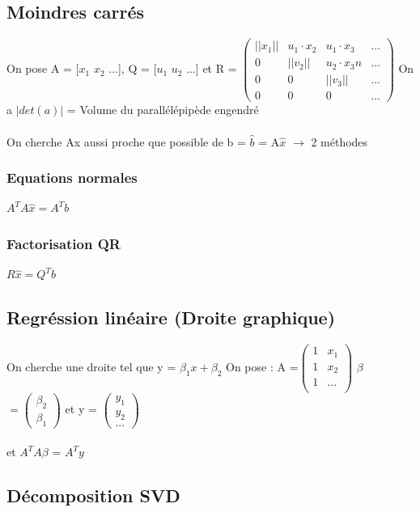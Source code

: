 \documentclass{article}
\begin{document}
\subsection{Moindres carrés}
On pose A = [$x_1$ $x_2$ ...], Q = [$u_1$ $u_2$ ...] et R = $\begin{pmatrix}
    ||x_1|| & u_1 \cdot x_2 & u_1 \cdot x_3 & ... \\
    0 & ||v_2|| & u_2 \cdot x_3n & ...\\
    0 & 0 & ||v_3|| & ... \\
    0 & 0 & 0 & ...
\end{pmatrix}$
On a $|det(a)|$ = Volume du parallélépipède engendré \\\\
On cherche Ax aussi proche que possible de b = $\hat{b}$ = A$\hat{x}$ $\rightarrow$ 2 méthodes
\subsubsection{Equations normales}
$A^TA\hat{x} = A^Tb$
\subsubsection{Factorisation QR}
$R\hat{x} = Q^Tb$
\subsection{Regréssion linéaire (Droite graphique)}
On cherche une droite tel que y = $\beta_1x + \beta_2$
On pose :
A =$ \begin{pmatrix}
    1 & x_1 \\
    1 & x_2 \\
    1 & ... \\
\end{pmatrix}$ 
$\beta $$= \begin{pmatrix}
    \beta_2 \\
    \beta_1
\end{pmatrix} $ 
et y = $\begin{pmatrix}
    y_1 \\
    y_2 \\
    ...
\end{pmatrix}$ \\\\
et $A^TA\beta$ = $A^Ty$

\subsection{Décomposition SVD}
\end{document}
